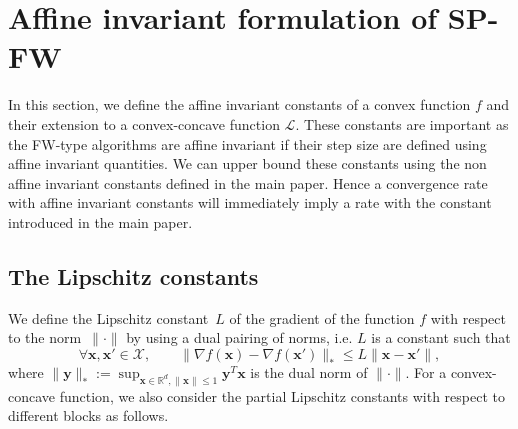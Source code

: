 \documentclass[twoside]{article}
\newcommand{\R}{\mathbb{R}}
\renewcommand{\L}{\mathcal{L}}
\newcommand{\X}{\mathcal{X}}
\newcommand{\x}{\bm{x}}
\newcommand{\y}{\bm{y}}
\newcommand{\0}{\mathbf{0}} %
\begin{document}
%
%
  
%
%
%
%
%
%
%
%
%
%
%
%
%
%
%
%
%
%
%
%
%

%
%
%
%
%
%
%
%
%

\section{Affine invariant formulation of SP-FW}
  \label{sec:affine_invariant}
  In this section, we define the affine invariant constants of a convex function $f$ and their extension to a convex-concave function $\L$. 
  These constants are important as the FW-type algorithms are affine invariant if their step size are defined using affine invariant quantities. 
  We can upper bound these constants using the non affine invariant constants defined in the main paper. 
  Hence a convergence rate with affine invariant constants will immediately imply a rate with the constant introduced in the main paper.
  \subsection{The Lipschitz constants} %
    \label{sub:the_lipschitz_constants}
    We define the Lipschitz constant~$L$ of the gradient of the function $f$ with respect to the norm~$\| \cdot\|$ by using a dual pairing of norms, i.e. $L$ is a constant such that 
    \begin{equation}
       \label{def:lip}
        \forall \x, \x' \in \X, \qquad \|\nabla f(\x) - \nabla f (\x') \|_* \leq L \| \x - \x'\|,
     \end{equation} 
     where $\|\y\|_* := \sup_{\x \in \R^d, \|\x\| \leq 1} \y^{T} \x$ is the dual norm of $\|\cdot \|$. For a convex-concave function, we also consider the partial Lipschitz constants with respect to different blocks as follows.
\end{document}
